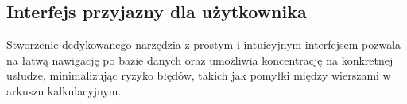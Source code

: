 \subsection{Interfejs przyjazny dla użytkownika}
Stworzenie dedykowanego narzędzia z prostym i intuicyjnym interfejsem pozwala na łatwą nawigację po bazie danych oraz umożliwia koncentrację na konkretnej usłudze, minimalizując ryzyko błędów, takich jak pomyłki między wierszami w arkuszu kalkulacyjnym.